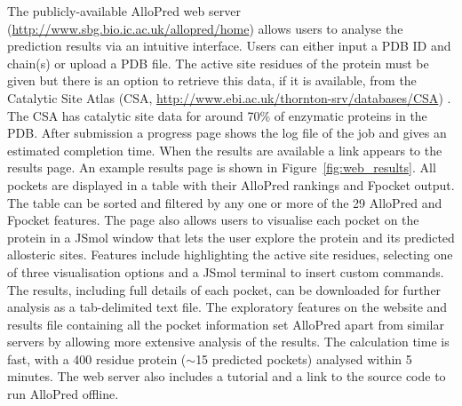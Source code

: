 The publicly-available AlloPred web server (\url{http://www.sbg.bio.ic.ac.uk/allopred/home}) allows users to analyse the prediction results via an intuitive interface.
Users can either input a PDB ID and chain(s) or upload a PDB file.
The active site residues of the protein must be given but there is an option to retrieve this data, if it is available, from the Catalytic Site Atlas (CSA, \url{http://www.ebi.ac.uk/thornton-srv/databases/CSA}) \cite{Furnham2014}.
The CSA has catalytic site data for around 70\% of enzymatic proteins in the PDB.
After submission a progress page shows the log file of the job and gives an estimated completion time.
When the results are available a link appears to the results page.
An example results page is shown in Figure~\ref{fig:web_results}.
All pockets are displayed in a table with their AlloPred rankings and Fpocket output.
The table can be sorted and filtered by any one or more of the 29 AlloPred and Fpocket features.
The page also allows users to visualise each pocket on the protein in a JSmol window that lets the user explore the protein and its predicted allosteric sites.
Features include highlighting the active site residues, selecting one of three visualisation options and a JSmol terminal to insert custom commands.
The results, including full details of each pocket, can be downloaded for further analysis as a tab-delimited text file.
The exploratory features on the website and results file containing all the pocket information set AlloPred apart from similar servers by allowing more extensive analysis of the results.
The calculation time is fast, with a 400 residue protein ($\sim$15 predicted pockets) analysed within 5 minutes.
The web server also includes a tutorial and a link to the source code to run AlloPred offline.


